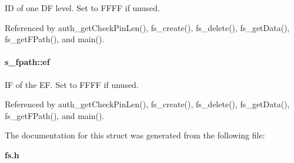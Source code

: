 ID of one DF level. Set to FFFF if unused. 



Referenced by auth\_\-getCheckPinLen(), fs\_\-create(), fs\_\-delete(), fs\_\-getData(), fs\_\-getFPath(), and main().

\paragraph[{ef}]{ {\bf s\_\-fpath::ef}}\hfill\label{structs__fpath_ae8103a76874a6b0588c88303126477c7}


IF of the EF. Set to FFFF if unused. 



Referenced by auth\_\-getCheckPinLen(), fs\_\-create(), fs\_\-delete(), fs\_\-getData(), fs\_\-getFPath(), and main().



The documentation for this struct was generated from the following file:\begin{DoxyCompactItemize}
\item 
{\bf fs.h}\end{DoxyCompactItemize}
